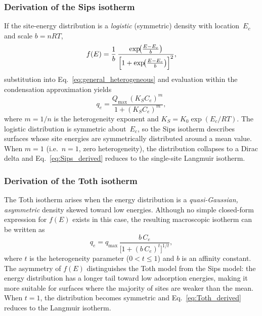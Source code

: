 \documentclass[12pt]{article}
\begin{document}
	\subsubsection{Derivation of the Sips isotherm}

	If the site-energy distribution is a \emph{logistic} (symmetric)
	density with location~$E_c$ and scale $b = nRT$,
	\begin{equation}
		f(E) = \frac{1}{b}\,
		\frac{\exp\!\bigl(\frac{E - E_c}{b}\bigr)}
		{\Bigl[1 + \exp\!\bigl(\frac{E - E_c}{b}\bigr)\Bigr]^{2}},
		\label{eq:sips_energy_dist}
	\end{equation}
	substitution into Eq.~\eqref{eq:general_heterogeneous} and evaluation
	within the condensation approximation yields
	\begin{equation}
		q_e = \frac{Q_{\max}\,(K_S C_e)^{m}}{1 + (K_S C_e)^{m}},
		\label{eq:Sips_derived}
	\end{equation}
	where $m = 1/n$ is the heterogeneity exponent and
	$K_S = K_0\exp(E_c / RT)$.
	The logistic distribution is symmetric about~$E_c$, so the Sips
	isotherm describes surfaces whose site energies are symmetrically
	distributed around a mean value.
	When $m = 1$ (i.e.\ $n = 1$, zero heterogeneity), the distribution
	collapses to a Dirac delta and Eq.~\eqref{eq:Sips_derived} reduces
	to the single-site Langmuir isotherm.

	\subsubsection{Derivation of the Toth isotherm}

	The Toth isotherm arises when the energy distribution is a
	\emph{quasi-Gaussian, asymmetric} density skewed toward low
	energies. Although no simple closed-form expression for $f(E)$
	exists in this case, the resulting macroscopic isotherm can be
	written as
	\begin{equation}
		q_e = q_{\max}\,
		\frac{b\,C_e}{\bigl[1 + (b\,C_e)^{t}\bigr]^{1/t}},
		\label{eq:Toth_derived}
	\end{equation}
	where $t$ is the heterogeneity parameter ($0 < t \leq 1$) and
	$b$ is an affinity constant. The asymmetry of $f(E)$ distinguishes
	the Toth model from the Sips model: the energy distribution has a
	longer tail toward low adsorption energies, making it more suitable
	for surfaces where the majority of sites are weaker than the mean.
	When $t = 1$, the distribution becomes symmetric and
	Eq.~\eqref{eq:Toth_derived} reduces to the Langmuir isotherm.
\end{document}
